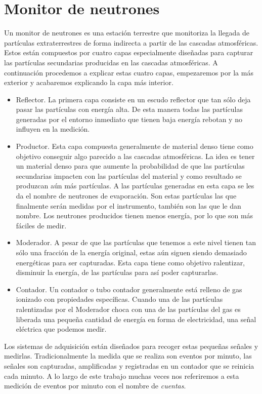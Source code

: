 \section{Monitor de neutrones}
	Un monitor de neutrones es una estación terrestre que monitoriza la llegada de partículas extraterrestres de forma indirecta a partir de las
	cascadas atmosféricas. Estos están compuestos por cuatro capas especialmente diseñadas para capturar las partículas secundarias producidas en
	las cascadas atmosféricas. A continuación procedemos a explicar estas cuatro capas, empezaremos por la más exterior y acabaremos explicando la
	capa más interior.
	\begin{itemize}
		\item	Reflector. La primera capa consiste en un escudo reflector que tan sólo deja pasar las partículas con energía alta. De esta
			manera todas las partículas generadas por el entorno inmediato que tienen baja energía rebotan y no influyen en la medición.
		\item	Productor. Esta capa compuesta generalmente de material denso tiene como objetivo conseguir algo parecido a las cascadas
			atmosféricas. La idea es tener un material denso para que aumente la probabilidad de que las partículas secundarias impacten
			con las partículas del material y como resultado se produzcan aún más partículas. A las partículas generadas en esta capa se
			les da el nombre de neutrones de evaporación. Son estas partículas las que finalmente serán medidas por el instrumento,
			también son las que le dan nombre. Los neutrones producidos tienen menos energía, por lo que son más fáciles de medir.
		\item	Moderador. A pesar de que las partículas que tenemos a este nivel tienen tan sólo una fracción de la energía original, estas
			aún siguen siendo demasiado energéticas para ser capturadas. Esta capa tiene como objetivo ralentizar, disminuir la energía,
			de las partículas para así poder capturarlas.
		\item	Contador. Un contador o tubo contador generalmente está relleno de gas ionizado con propiedades específicas. Cuando una de
			las partículas ralentizadas por el Moderador choca con una de las partículas del gas es liberada una pequeña cantidad de
			energía en forma de electricidad, una señal eléctrica que podemos medir. 
	\end{itemize}
	\par
	Los sistemas de adquisición están diseñados para recoger estas pequeñas señales y medirlas. Tradicionalmente la medida que se realiza son
	eventos por minuto, las señales son capturadas, amplificadas y registradas en un contador que se reinicia cada minuto. A lo largo de este
	trabajo muchas veces nos referiremos a esta medición de eventos por minuto con el nombre de \emph{cuentas}. 

